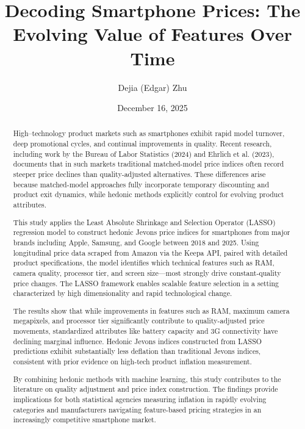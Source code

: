 \documentclass[12pt]{article}
\title{Decoding Smartphone Prices: The Evolving Value of Features Over Time}
\author{Dejia (Edgar) Zhu}
\date{December 16, 2025}
\begin{document}
\maketitle
\thispagestyle{empty}

\begin{abstract}
High–technology product markets such as smartphones exhibit rapid model turnover, deep promotional cycles, and continual improvements in quality. Recent research, including work by the Bureau of Labor Statistics (2024) and Ehrlich et al. (2023), documents that in such markets traditional matched-model price indices often record steeper price declines than quality-adjusted alternatives. These differences arise because matched-model approaches fully incorporate temporary discounting and product exit dynamics, while hedonic methods explicitly control for evolving product attributes. 

This study applies the Least Absolute Shrinkage and Selection Operator (LASSO) regression model to construct hedonic Jevons price indices for smartphones from major brands including Apple, Samsung, and Google between 2018 and 2025. Using longitudinal price data scraped from Amazon via the Keepa API, paired with detailed product specifications, the model identifies which technical features such as RAM, camera quality, processor tier, and screen size—most strongly drive constant‐quality price changes. The LASSO framework enables scalable feature selection in a setting characterized by high dimensionality and rapid technological change. 

The results show that while improvements in features such as RAM, maximum camera megapixels, and processor tier significantly contribute to quality-adjusted price movements, standardized attributes like battery capacity and 3G connectivity have declining marginal influence. Hedonic Jevons indices constructed from LASSO predictions exhibit substantially less deflation than traditional Jevons indices, consistent with prior evidence on high-tech product inflation measurement. 

By combining hedonic methods with machine learning, this study contributes to the literature on quality adjustment and price index construction. The findings provide implications for both statistical agencies measuring inflation in rapidly evolving categories and manufacturers navigating feature-based pricing strategies in an increasingly competitive smartphone market.
\end{abstract}


\newpage
\end{document}
